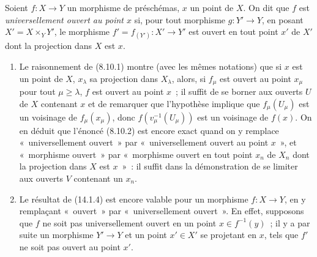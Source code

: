 \begin{definition}[14.3.3]
\label{IV.14.3.3-fr}
Soient $f:X\to Y$ un morphisme de préschémas, $x$ un point de $X$. On dit que $f$
est \emph{universellement ouvert au point $x$} si, pour tout morphisme $g:Y'\to Y$,
en posant $X'=X\times_Y Y'$, le morphisme $f'=f_{(Y')}:X'\to Y'$ est ouvert en
tout point $x'$ de $X'$ dont la projection dans $X$ est $x$.
\end{definition}

\begin{remarks}[14.3.3.1]
\label{IV.14.3.3.1-fr}
\begin{enumerate}[label=(\roman*)]
  \item Le raisonnement de (8.10.1) montre (avec les mêmes notations) que si $x$
  est un point de $X$, $x_\lambda$ sa projection dans $X_\lambda$, alors, si
  $f_\mu$ est ouvert au point $x_\mu$ pour tout $\mu\geq\lambda$, $f$ est ouvert
  au point $x$~; il suffit de se borner aux ouverts $U$ de $X$ contenant $x$ et de
  remarquer que l'hypothèse implique que $f_\mu(U_\mu)$ est un voisinage de
  $f_\mu(x_\mu)$, donc $f(v_\mu^{-1}(U_\mu))$ est un voisinage de $f(x)$. On en
  déduit que l'énoncé (8.10.2) est encore exact quand on y remplace
  «~universellement ouvert~» par «~universellement ouvert au point $x$~», et
  «~morphisme ouvert~» par «~morphisme ouvert en tout point $x_n$ de $X_n$ dont
  la projection dans $X$ est $x$~»~: il suffit dans la démonstration de se limiter
  aux ouverts $V$ contenant un $x_n$.

  \item Le résultat de (14.1.4) est encore valable pour un morphisme $f:X\to Y$,
  en y remplaçant «~ouvert~» par «~universellement ouvert~». En effet, supposons
  que $f$ ne soit pas universellement ouvert en un point $x\in f^{-1}(y)$~; il y a
  par suite un morphisme $Y'\to Y$ et un point $x'\in X'$ se projetant en $x$, tels
  que $f'$ ne soit pas ouvert au point $x'$.
\end{enumerate}
\end{remarks}

